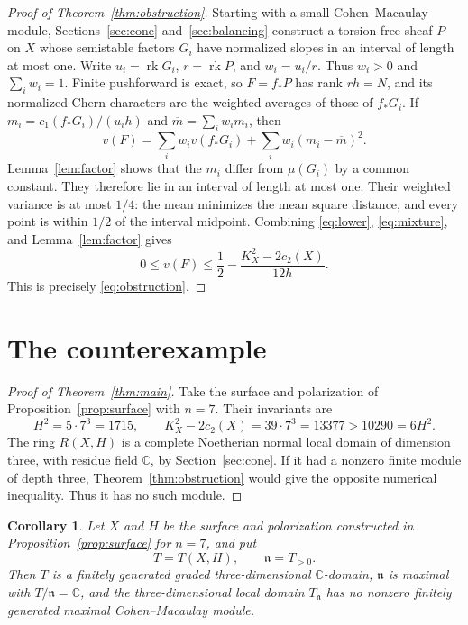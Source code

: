 \documentclass[11pt]{article}
\newtheorem{corollary}[theorem]{Corollary}
\theoremstyle{remark}
\newcommand{\C}{\mathbb C}
\DeclareMathOperator{\rk}{rk}
\begin{document}
\begin{proof}[Proof of Theorem~\ref{thm:obstruction}]
Starting with a small Cohen--Macaulay module, Sections~\ref{sec:cone}
and~\ref{sec:balancing} construct a torsion-free sheaf $P$ on $X$ whose
semistable factors $G_i$ have normalized slopes in an interval of length
at most one. Write $u_i=\rk G_i$, $r=\rk P$, and $w_i=u_i/r$.
Thus $w_i>0$ and $\sum_iw_i=1$. Finite pushforward is exact, so
$F=f_*P$ has rank $rh=N$, and its normalized Chern characters are the
weighted averages of those of $f_*G_i$.
If $m_i=c_1(f_*G_i)/(u_ih)$ and $\overline m=\sum_iw_i m_i$, then
\begin{equation}\label{eq:mixture}
 v(F)=\sum_iw_i v(f_*G_i)+\sum_iw_i(m_i-\overline m)^2.
\end{equation}
Lemma~\ref{lem:factor} shows that the $m_i$ differ from $\mu(G_i)$ by a
common constant. They therefore lie in an interval of length at most
one. Their weighted variance is at most $1/4$: the mean minimizes the
mean square distance, and every point is within $1/2$ of the interval
midpoint. Combining \eqref{eq:lower}, \eqref{eq:mixture}, and
Lemma~\ref{lem:factor} gives
\[
 0\leq v(F)\leq\frac12-\frac{K_X^2-2c_2(X)}{12h}.
\]
This is precisely \eqref{eq:obstruction}.
\end{proof}



\section{The counterexample}\label{sec:conclusion}
\begin{proof}[Proof of Theorem~\ref{thm:main}]
Take the surface and polarization of Proposition~\ref{prop:surface}
with $n=7$. Their invariants are
\[
 H^2=5\cdot7^3=1715,\qquad
 K_X^2-2c_2(X)=39\cdot7^3=13377>10290=6H^2.
\]
The ring $R(X,H)$ is a complete Noetherian normal local domain of
dimension three, with residue field $\C$, by Section~\ref{sec:cone}.
If it had a nonzero finite module of depth three,
Theorem~\ref{thm:obstruction} would give the opposite numerical
inequality. Thus it has no such module.
\end{proof}

\begin{corollary}\label{cor:affine-local}
Let $X$ and $H$ be the surface and polarization constructed in
Proposition~\ref{prop:surface} for $n=7$, and put
\[
 T=T(X,H),\qquad \mathfrak n=T_{>0}.
\]
Then $T$ is a finitely generated graded three-dimensional $\C$-domain,
$\mathfrak n$ is maximal with $T/\mathfrak n=\C$, and the
three-dimensional local domain $T_{\mathfrak n}$ has no nonzero finitely
generated maximal Cohen--Macaulay module.
\end{corollary}
\end{document}
